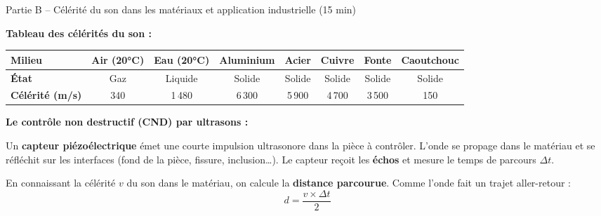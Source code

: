 \documentclass[12pt,a4paper]{article}
\begin{document}
\vspace{4pt}

\begin{tcolorbox}[stylepartie]
  Partie B -- Célérité du son dans les matériaux et application industrielle \hfill {\normalfont\small (15 min)}
\end{tcolorbox}

\begin{tcolorbox}[styledoc, title={Document 2 -- Célérité du son dans différents milieux et contrôle non destructif}]

  \textbf{Tableau des célérités du son :}

  \vspace{6pt}
  \begin{center}
  \footnotesize
  \renewcommand{\arraystretch}{1.3}
  \begin{tabular}{|l|c|c|c|c|c|c|c|}
    \hline
    \rowcolor{bluemid}
    \textbf{Milieu}          & \textbf{Air (20°C)} & \textbf{Eau (20°C)} & \textbf{Aluminium} & \textbf{Acier} & \textbf{Cuivre} & \textbf{Fonte} & \textbf{Caoutchouc} \\
    \hline
    \textbf{État}            & Gaz & Liquide & Solide & Solide & Solide & Solide & Solide \\
    \hline
    \textbf{Célérité (m/s)}  & 340 & 1\,480  & 6\,300 & 5\,900 & 4\,700 & 3\,500 & 150 \\
    \hline
  \end{tabular}
  \end{center}

  \vspace{8pt}

  \textbf{Le contrôle non destructif (CND) par ultrasons :}

  \medskip

  Un \textbf{capteur piézoélectrique} émet une courte impulsion ultrasonore dans la pièce
  à contrôler. L'onde se propage dans le matériau et se réfléchit sur les interfaces
  (fond de la pièce, fissure, inclusion\ldots). Le capteur reçoit les \textbf{échos} et mesure
  le temps de parcours $\Delta t$.

  En connaissant la célérité $v$ du son dans le matériau, on calcule la \textbf{distance
  parcourue}. Comme l'onde fait un trajet aller-retour :
  \[
    d = \frac{v \times \Delta t}{2}
  \]


\end{tcolorbox}
\end{document}
